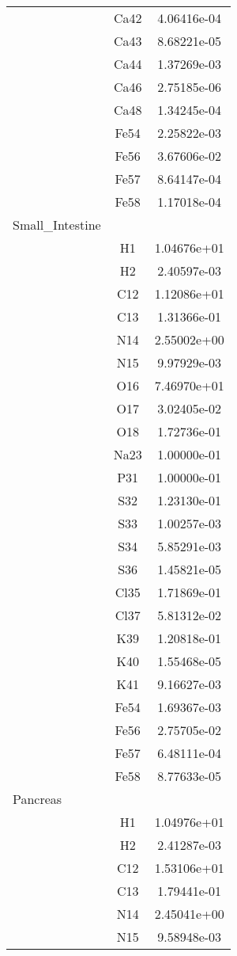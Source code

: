 \begin{centering}
\begin{longtable}{l c c}
& Ca42 & 4.06416e-04 \\ 
& Ca43 & 8.68221e-05 \\ 
& Ca44 & 1.37269e-03 \\ 
& Ca46 & 2.75185e-06 \\ 
& Ca48 & 1.34245e-04 \\ 
& Fe54 & 2.25822e-03 \\ 
& Fe56 & 3.67606e-02 \\ 
& Fe57 & 8.64147e-04 \\ 
& Fe58 & 1.17018e-04 \\ 
\hline
Small_Intestine & & \\
\hline
& H1 & 1.04676e+01 \\ 
& H2 & 2.40597e-03 \\ 
& C12 & 1.12086e+01 \\ 
& C13 & 1.31366e-01 \\ 
& N14 & 2.55002e+00 \\ 
& N15 & 9.97929e-03 \\ 
& O16 & 7.46970e+01 \\ 
& O17 & 3.02405e-02 \\ 
& O18 & 1.72736e-01 \\ 
& Na23 & 1.00000e-01 \\ 
& P31 & 1.00000e-01 \\ 
& S32 & 1.23130e-01 \\ 
& S33 & 1.00257e-03 \\ 
& S34 & 5.85291e-03 \\ 
& S36 & 1.45821e-05 \\ 
& Cl35 & 1.71869e-01 \\ 
& Cl37 & 5.81312e-02 \\ 
& K39 & 1.20818e-01 \\ 
& K40 & 1.55468e-05 \\ 
& K41 & 9.16627e-03 \\ 
& Fe54 & 1.69367e-03 \\ 
& Fe56 & 2.75705e-02 \\ 
& Fe57 & 6.48111e-04 \\ 
& Fe58 & 8.77633e-05 \\ 
\hline
Pancreas & & \\
\hline
& H1 & 1.04976e+01 \\ 
& H2 & 2.41287e-03 \\ 
& C12 & 1.53106e+01 \\ 
& C13 & 1.79441e-01 \\ 
& N14 & 2.45041e+00 \\ 
& N15 & 9.58948e-03 \\ 

\end{longtable}
\end{centering}
